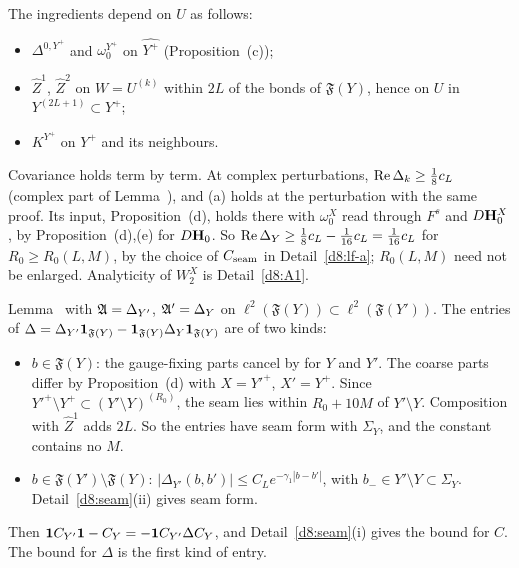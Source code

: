 \begin{detail}\label{d8:lf-bd}
\begin{step}[(b)]
The ingredients depend on $U$ as follows:
\begin{itemize}
\item $\Delta^{0,Y^+}$ and $\omega_0^{Y^+}$ on $\widehat{Y^+}$ (Proposition~(c));
\item $\hat Z^1$, $\hat Z^2$ on $W=U^{(k)}$ within $2L$ of the bonds of $\mathfrak F(Y)$, hence on $U$ in $Y^{(2L+1)}\subset Y^+$;
\item $K^{Y^+}$ on $Y^+$ and its neighbours.
\end{itemize}
Covariance holds term by term. At complex perturbations, $\operatorname{Re}\Delta_k\ge\frac18c_L$ (complex part of Lemma~), and (a) holds at the perturbation with the same proof. Its input, Proposition~(d), holds there with $\omega_0^X$ read through $F^s$ and $D\mathbf H_0^X$, by Proposition~(d),(e) for $D\mathbf H_0$. So $\operatorname{Re}\Delta_Y\ge\frac18c_L-\frac1{16}c_L=\frac1{16}c_L$ for $R_0\ge R_0(L,M)$, by the choice of $C_{\rm seam}$ in Detail~\ref{d8:lf-a}; $R_0(L,M)$ need not be enlarged. Analyticity of $W_2^X$ is Detail~\ref{d8:A1}.
\end{step}
\begin{step}[(c)]
Lemma~ with $\mathfrak A=\Delta_{Y'}$, $\mathfrak A'=\Delta_Y$ on $\ell^2(\mathfrak F(Y))\subset\ell^2(\mathfrak F(Y'))$. The entries of $\Delta=\Delta_{Y'}\mathbf 1_{\mathfrak F(Y)}-\mathbf 1_{\mathfrak F(Y)}\Delta_Y\mathbf 1_{\mathfrak F(Y)}$ are of two kinds:
\begin{itemize}
\item $b\in\mathfrak F(Y)$: the gauge-fixing parts cancel by  for $Y$ and $Y'$. The coarse parts differ by Proposition~(d) with $X=Y'^+$, $X'=Y^+$. Since $Y'^+\setminus Y^+\subset(Y'\setminus Y)^{(R_0)}$, the seam lies within $R_0+10M$ of $Y'\setminus Y$. Composition with $\hat Z^1$ adds $2L$. So the entries have seam form with $\Sigma_Y$, and the constant contains no $M$.
\item $b\in\mathfrak F(Y')\setminus\mathfrak F(Y)$: $|\Delta_{Y'}(b,b')|\le C_Le^{-\gamma_1|b-b'|}$, with $b_-\in Y'\setminus Y\subset\Sigma_Y$. Detail~\ref{d8:seam}(ii) gives seam form.
\end{itemize}
Then $\mathbf 1 C_{Y'}\mathbf 1-C_Y=-\mathbf 1 C_{Y'}\Delta C_Y$, and Detail~\ref{d8:seam}(i) gives the bound for $C$. The bound for $\Delta$ is the first kind of entry.

\end{step}
\end{detail}
